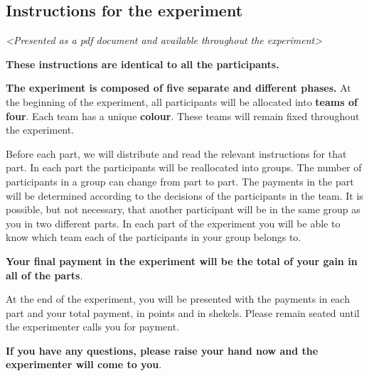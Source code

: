 



%
\setlength\parindent{0pt}




\subsection*{Instructions for the experiment}
\emph{<Presented as a pdf document and available throughout the experiment>}
\bigskip

\textbf{These instructions are identical to all the participants.}

\textbf{The experiment is composed of five separate and different phases.} At the beginning of the experiment, all participants will be allocated into \textbf{teams of four}. Each team has a unique \textbf{colour}. These teams will remain fixed throughout the experiment.

Before each part, we will distribute and read the relevant instructions for that part. In each part the participants will be reallocated into groups. The number of participants in a group can change from part to part. The payments in the part will be determined according to the decisions of the participants in the team. It is possible, but not necessary, that another participant will be in the same group as you in two different parts. In each part of the experiment you will be able to know which team each of the participants in your group belongs to.

\textbf{Your final payment in the experiment will be the total of your gain in all of the parts}.

At the end of the experiment, you will be presented with the payments in each part and your total payment, in points and in shekels. Please remain seated until the experimenter calls you for payment.

\textbf{If you have any questions, please raise your hand now and the experimenter will come to you}.

